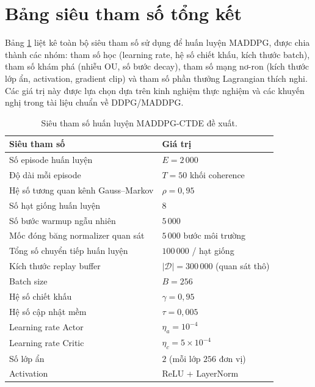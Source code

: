 \section{Bảng siêu tham số tổng kết}
\label{sec:hyperparameters}

Bảng \ref{tab:hyperparameters} liệt kê toàn bộ siêu tham số sử dụng để
huấn luyện MADDPG, được chia thành các nhóm: tham số học (learning rate,
hệ số chiết khấu, kích thước batch), tham số khám phá (nhiễu OU, số bước
decay), tham số mạng nơ-ron (kích thước lớp ẩn, activation, gradient
clip) và tham số phần thưởng Lagrangian thích nghi. Các giá trị này
được lựa chọn dựa trên kinh nghiệm thực nghiệm và các khuyến nghị trong
tài liệu chuẩn về DDPG/MADDPG.

\begin{table}[t]
\centering
\caption{Siêu tham số huấn luyện MADDPG-CTDE đề xuất.}
\label{tab:hyperparameters}
\begin{tabular}{p{5.5cm} l}
\toprule
\textbf{Siêu tham số} & \textbf{Giá trị} \\
\midrule
Số episode huấn luyện               & $E = 2\,000$ \\
Độ dài mỗi episode                  & $T = 50$ khối coherence \\
Hệ số tương quan kênh Gauss--Markov & $\rho = 0{,}95$ \\
Số hạt giống huấn luyện             & $8$ \\
Số bước warmup ngẫu nhiên           & $5\,000$ \\
Mốc đóng băng normalizer quan sát   & $5\,000$ bước môi trường \\
Tổng số chuyển tiếp huấn luyện      & $100\,000$ / hạt giống \\
Kích thước replay buffer            & $|\mathcal{D}| = 300\,000$ (quan sát thô) \\
Batch size                          & $B = 256$ \\
Hệ số chiết khấu                    & $\gamma = 0{,}95$ \\
Hệ số cập nhật mềm                  & $\tau = 0{,}005$ \\
Learning rate Actor                 & $\eta_a = 10^{-4}$ \\
Learning rate Critic                & $\eta_c = 5 \times 10^{-4}$ \\
Số lớp ẩn                           & $2$ (mỗi lớp $256$ đơn vị) \\
Activation                          & ReLU + LayerNorm \\

\end{tabular}
\end{table}
